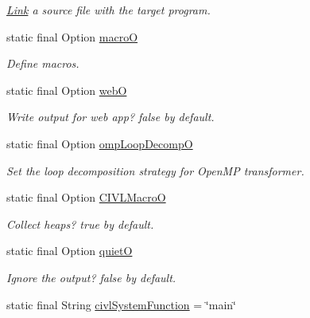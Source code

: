 \begin{DoxyCompactItemize}
\begin{DoxyCompactList}\small\item\em \hyperlink{structLink}{Link} a source file with the target program. \end{DoxyCompactList}\item 
static final Option \hyperlink{classedu_1_1udel_1_1cis_1_1vsl_1_1civl_1_1config_1_1IF_1_1CIVLConstants_a3b642ef3af1e7a00c1f176b2ac936e43}{macro\+O}
\begin{DoxyCompactList}\small\item\em Define macros. \end{DoxyCompactList}\item 
static final Option \hyperlink{classedu_1_1udel_1_1cis_1_1vsl_1_1civl_1_1config_1_1IF_1_1CIVLConstants_a04157ad0ddb32229565aa679373a5039}{web\+O}
\begin{DoxyCompactList}\small\item\em Write output for web app? false by default. \end{DoxyCompactList}\item 
static final Option \hyperlink{classedu_1_1udel_1_1cis_1_1vsl_1_1civl_1_1config_1_1IF_1_1CIVLConstants_a25129abac8ff9753a7a4ab39b19d6ec5}{omp\+Loop\+Decomp\+O}
\begin{DoxyCompactList}\small\item\em Set the loop decomposition strategy for Open\+M\+P transformer. \end{DoxyCompactList}\item 
static final Option \hyperlink{classedu_1_1udel_1_1cis_1_1vsl_1_1civl_1_1config_1_1IF_1_1CIVLConstants_ae46fc49122a4454b55686126de58a913}{C\+I\+V\+L\+Macro\+O}
\begin{DoxyCompactList}\small\item\em Collect heaps? true by default. \end{DoxyCompactList}\item 
static final Option \hyperlink{classedu_1_1udel_1_1cis_1_1vsl_1_1civl_1_1config_1_1IF_1_1CIVLConstants_a1e27a5de82b9f6ea3eaa4ccd18d3530a}{quiet\+O}
\begin{DoxyCompactList}\small\item\em Ignore the output? false by default. \end{DoxyCompactList}\item 
\hypertarget{classedu_1_1udel_1_1cis_1_1vsl_1_1civl_1_1config_1_1IF_1_1CIVLConstants_a5a7f847795a878aba5d1679b5984d1cf}{}static final String \hyperlink{classedu_1_1udel_1_1cis_1_1vsl_1_1civl_1_1config_1_1IF_1_1CIVLConstants_a5a7f847795a878aba5d1679b5984d1cf}{civl\+System\+Function} = \char`\"{}main\char`\"{}\label{classedu_1_1udel_1_1cis_1_1vsl_1_1civl_1_1config_1_1IF_1_1CIVLConstants_a5a7f847795a878aba5d1679b5984d1cf}


\end{DoxyCompactItemize}
